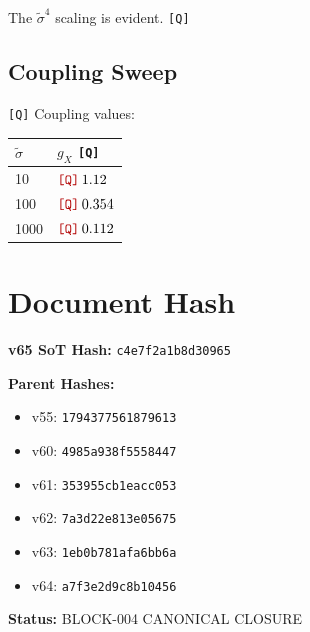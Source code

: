 \documentclass[11pt,a4paper]{article}
\newcommand{\Qnum}[1]{\textcolor{red!70!black}{\texttt{[Q]}}\,#1}
\newcommand{\tagQ}{\textcolor{red!70!black}{\texttt{[Q]}}}
\theoremstyle{definition}
\begin{document}
The $\tilde{\sigma}^4$ scaling is evident. \tagQ{}

\subsection{Coupling Sweep}
\label{subsec:coupling-sweep}

\tagQ{} Coupling values:
\begin{center}
\begin{tabular}{ll}
\toprule
$\tilde{\sigma}$ & $g_X$ \tagQ{} \\
\midrule
10 & $\Qnum{1.12}$ \\
100 & $\Qnum{0.354}$ \\
1000 & $\Qnum{0.112}$ \\
\bottomrule
\end{tabular}
\end{center}



\section*{Document Hash}
\label{sec:hash}

\begin{statusbox}
\textbf{v65 SoT Hash:} \texttt{c4e7f2a1b8d30965}

\textbf{Parent Hashes:}
\begin{itemize}
  \item v55: \texttt{1794377561879613}
  \item v60: \texttt{4985a938f5558447}
  \item v61: \texttt{353955cb1eacc053}
  \item v62: \texttt{7a3d22e813e05675}
  \item v63: \texttt{1eb0b781afa6bb6a}
  \item v64: \texttt{a7f3e2d9c8b10456}
\end{itemize}

\textbf{Status:} BLOCK-004 CANONICAL CLOSURE
\end{statusbox}
\end{document}

